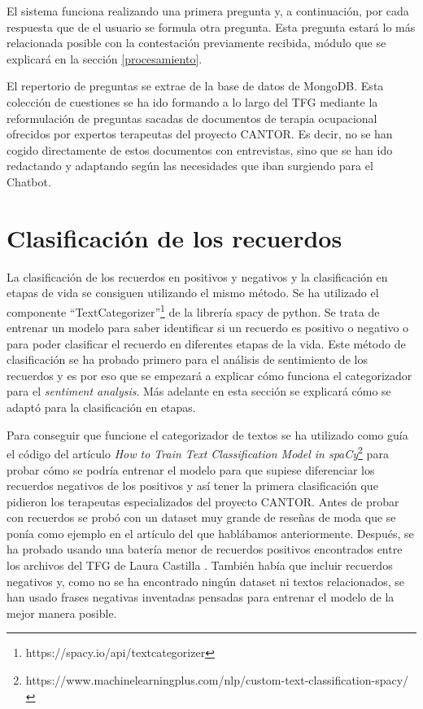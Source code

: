 El sistema funciona realizando una primera pregunta y, a continuación, por cada respuesta que de el usuario se formula otra pregunta. Esta pregunta estará lo más relacionada posible con la contestación previamente recibida, módulo que se explicará en la sección \ref{procesamiento}. 

El repertorio de preguntas se extrae de la base de datos de MongoDB. Esta colección de cuestiones se ha ido formando a lo largo del TFG mediante la reformulación de preguntas sacadas de documentos de terapia ocupacional ofrecidos por expertos terapeutas del proyecto CANTOR. Es decir, no se han cogido directamente de estos documentos con entrevistas, sino que se han ido redactando y adaptando según las necesidades que iban surgiendo para el Chatbot. 

\section{Clasificación de los recuerdos}

La clasificación de los recuerdos en positivos y negativos y la clasificación en etapas de vida se consiguen utilizando el mismo método. Se ha utilizado el componente ``TextCategorizer''\footnote{https://spacy.io/api/textcategorizer} de la librería spacy de python. Se trata de entrenar un modelo para saber identificar si un recuerdo es positivo o negativo o para poder clasificar el recuerdo en diferentes etapas de la vida. Este método de clasificación se ha probado primero para el análisis de sentimiento de los recuerdos y es por eso que se empezará a explicar cómo funciona el categorizador para el \textit{sentiment analysis}. Más adelante en esta sección se explicará cómo se adaptó para la clasificación en etapas. 

Para conseguir que funcione el categorizador de textos se ha utilizado como guía el código del artículo \textit{How to Train Text Classification Model in spaCy}\footnote{https://www.machinelearningplus.com/nlp/custom-text-classification-spacy/} para probar cómo se podría entrenar el modelo para que supiese diferenciar los recuerdos negativos de los positivos y así tener la primera clasificación que pidieron los terapeutas especializados del proyecto CANTOR. Antes de probar con recuerdos se probó con un dataset muy grande de reseñas de moda que se ponía como ejemplo en el artículo del que hablábamos anteriormente. Después, se ha probado usando una batería menor de recuerdos positivos encontrados entre los archivos del TFG de Laura Castilla \cite{lcastilla}. También había que incluir recuerdos negativos y, como no se ha encontrado ningún dataset ni textos relacionados, se han usado frases negativas inventadas pensadas para entrenar el modelo de la mejor manera posible.

